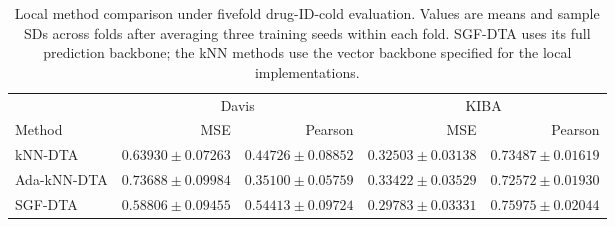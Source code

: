 \begin{table}[htbp]
\centering
\caption{Local method comparison under fivefold drug-ID-cold evaluation. Values are means and sample SDs across folds after averaging three training seeds within each fold. SGF-DTA uses its full prediction backbone; the kNN methods use the vector backbone specified for the local implementations.}
\label{tab:knn_overall}
\small
\begin{tabular}{lrrrr}
\toprule
& \multicolumn{2}{c}{Davis} & \multicolumn{2}{c}{KIBA} \\
\cmidrule(lr){2-3}\cmidrule(lr){4-5}
Method & MSE & Pearson & MSE & Pearson \\
\midrule
kNN-DTA & $0.63930 \pm 0.07263$ & $0.44726 \pm 0.08852$ & $0.32503 \pm 0.03138$ & $0.73487 \pm 0.01619$ \\
Ada-kNN-DTA & $0.73688 \pm 0.09984$ & $0.35100 \pm 0.05759$ & $0.33422 \pm 0.03529$ & $0.72572 \pm 0.01930$ \\
SGF-DTA & $0.58806 \pm 0.09455$ & $0.54413 \pm 0.09724$ & $0.29783 \pm 0.03331$ & $0.75975 \pm 0.02044$ \\
\bottomrule
\end{tabular}
\end{table}
